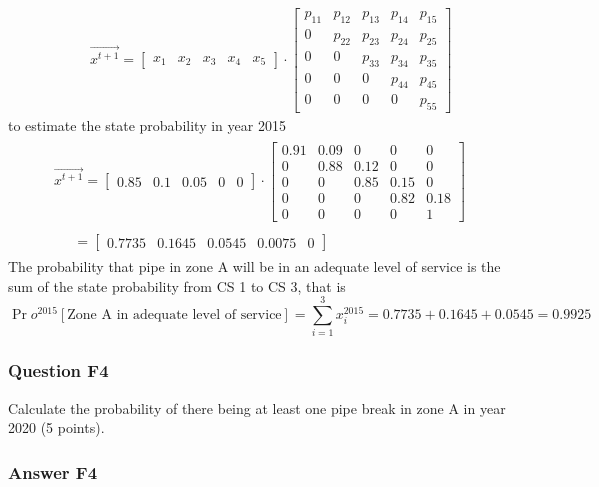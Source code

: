 \begin{eqnarray}
&& \overrightarrow {{x^{t + 1}}}  = \left[ {\begin{array}{*{20}{c}}
{{x_1}}&{{x_2}}&{{x_3}}&{{x_4}}&{{x_5}}
\end{array}} \right] \cdot \left[ {\begin{array}{*{20}{c}}
{{p_{11}}}&{{p_{12}}}&{{p_{13}}}&{{p_{14}}}&{{p_{15}}}\\
0&{{p_{22}}}&{{p_{23}}}&{{p_{24}}}&{{p_{25}}}\\
0&0&{{p_{33}}}&{{p_{34}}}&{{p_{35}}}\\
0&0&0&{{p_{44}}}&{{p_{45}}}\\
0&0&0&0&{{p_{55}}}
\end{array}} \right]
\label{eq-reliability-a39}
\end{eqnarray}
to estimate the state probability in year 2015
%
\begin{eqnarray}
\begin{array}{l}
\overrightarrow {{x^{t + 1}}}  = \left[ {\begin{array}{*{20}{c}}
{0.85}&{0.1}&{0.05}&0&0
\end{array}} \right] \cdot \left[ {\begin{array}{*{20}{c}}
{0.91}&{0.09}&0&0&0\\
0&{0.88}&{0.12}&0&0\\
0&0&{0.85}&{0.15}&0\\
0&0&0&{0.82}&{0.18}\\
0&0&0&0&1
\end{array}} \right]\\
\;\;\;\;\;\\
\;\;\;\;\; = \left[ {\begin{array}{*{20}{c}}
{0.7735}&{0.1645}&{0.0545}&{0.0075}&0
\end{array}} \right]
\end{array}
\label{eq-reliability-a40}
\end{eqnarray}
The probability that pipe in zone A will be in an adequate level of service is
the sum of the state probability from CS 1 to CS 3, that is
\[
\Pr {o^{2015}}\left[ {{\text{Zone A in adequate level of service}}} \right] =
\sum\limits_{i = 1}^3 {x_i^{2015} = 0.7735 + 0.1645 + 0.0545 = 0.9925}
\]
\subsubsection{Question F4}
Calculate the probability of there being at least one pipe break in zone A in
year 2020 (5 points).
\subsubsection{Answer F4}

